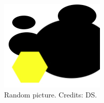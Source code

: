 \begin{figure}[!t]
\vspace*{-0.35cm}
\centering
\includegraphics[scale=1.0]{plots/chapter2/pic.jpg}
\caption[Random picture]{Random picture. Credits: DS.}
\end{figure}